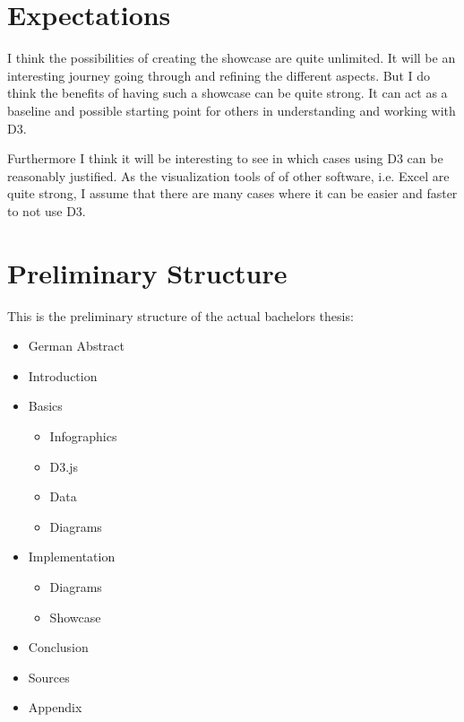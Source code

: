 \documentclass[
a4paper,     %
12pt         %
]{scrartcl}  %
\begin{document}
\section{Expectations}
I think the possibilities of creating the showcase are quite unlimited. It will be an interesting journey going through and refining the different aspects. But I do think the benefits of having such a showcase can be quite strong. It can act as a baseline and possible starting point for others in understanding and working with D3. 

Furthermore I think it will be interesting to see in which cases using D3 can be reasonably justified. As the visualization tools of of other software, i.e. Excel are quite strong, I assume that there are many cases where it can be easier and faster to not use D3. 

\section{Preliminary Structure}
This is the preliminary structure of the actual bachelors thesis:

\begin{itemize}
  \item German Abstract
  \item Introduction
  \item Basics
  \begin{itemize}
    \item Infographics
    \item D3.js
    \item Data
    \item Diagrams
  \end{itemize}
  \item Implementation
  \begin{itemize}
    \item Diagrams
    \item Showcase
  \end{itemize}
  \item Conclusion
  \item Sources
  \item Appendix
\end{itemize}

\newpage


\appendix  %




\end{document}
